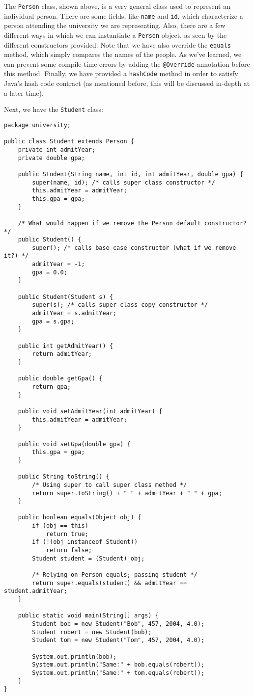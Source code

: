 The \verb!Person! class, shown above, is a very general class used to represent an individual person. There are some fields, like \verb!name! and \verb!id!, which characterize a person attending the university we are representing. Also, there are a few different ways in which we can instantiate a \verb!Person! object, as seen by the different constructors provided. Note that we have also override the \verb!equals! method, which simply compares the names of the people. As we've learned, we can prevent some compile-time errors by adding the \verb!@Override! annotation before this method. Finally, we have provided a \verb!hashCode! method in order to satisfy Java's hash code contract (as mentioned before, this will be discussed in-depth at a later time).


Next, we have the \verb!Student! class:

\begin{lstlisting}
package university;

public class Student extends Person {
	private int admitYear;
	private double gpa;

	public Student(String name, int id, int admitYear, double gpa) {
		super(name, id); /* calls super class constructor */
		this.admitYear = admitYear;
		this.gpa = gpa;
	}

	/* What would happen if we remove the Person default constructor? */
	public Student() {
		super(); /* calls base case constructor (what if we remove it?) */
		admitYear = -1;
		gpa = 0.0;
	}

	public Student(Student s) {
		super(s); /* calls super class copy constructor */
		admitYear = s.admitYear;
		gpa = s.gpa;
	}

	public int getAdmitYear() {
		return admitYear;
	}

	public double getGpa() {
		return gpa;
	}

	public void setAdmitYear(int admitYear) {
		this.admitYear = admitYear;
	}

	public void setGpa(double gpa) {
		this.gpa = gpa;
	}

	public String toString() {
		/* Using super to call super class method */
		return super.toString() + " " + admitYear + " " + gpa;
	}

	public boolean equals(Object obj) {
		if (obj == this)
			return true;
		if (!(obj instanceof Student))
			return false;
		Student student = (Student) obj;

		/* Relying on Person equals; passing student */
		return super.equals(student) && admitYear == student.admitYear;
	}

	public static void main(String[] args) {
		Student bob = new Student("Bob", 457, 2004, 4.0);
		Student robert = new Student(bob);
		Student tom = new Student("Tom", 457, 2004, 4.0);

		System.out.println(bob);
		System.out.println("Same:" + bob.equals(robert));
		System.out.println("Same:" + tom.equals(robert));
	}
}
\end{lstlisting}

